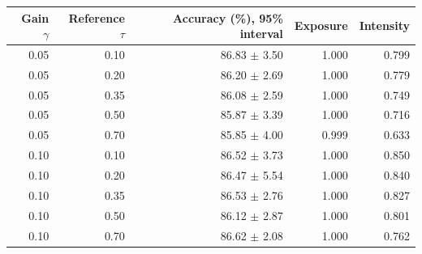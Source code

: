 \begin{tabular}{rrrrr}
\toprule
Gain $\gamma$ & Reference $\tau$ & Accuracy (\%), 95\% interval & Exposure & Intensity \\
\midrule
0.05 & 0.10 & 86.83 $\pm$ 3.50 & 1.000 & 0.799 \\
0.05 & 0.20 & 86.20 $\pm$ 2.69 & 1.000 & 0.779 \\
0.05 & 0.35 & 86.08 $\pm$ 2.59 & 1.000 & 0.749 \\
0.05 & 0.50 & 85.87 $\pm$ 3.39 & 1.000 & 0.716 \\
0.05 & 0.70 & 85.85 $\pm$ 4.00 & 0.999 & 0.633 \\
0.10 & 0.10 & 86.52 $\pm$ 3.73 & 1.000 & 0.850 \\
0.10 & 0.20 & 86.47 $\pm$ 5.54 & 1.000 & 0.840 \\
0.10 & 0.35 & 86.53 $\pm$ 2.76 & 1.000 & 0.827 \\
0.10 & 0.50 & 86.12 $\pm$ 2.87 & 1.000 & 0.801 \\
0.10 & 0.70 & 86.62 $\pm$ 2.08 & 1.000 & 0.762 \\
\bottomrule
\end{tabular}
